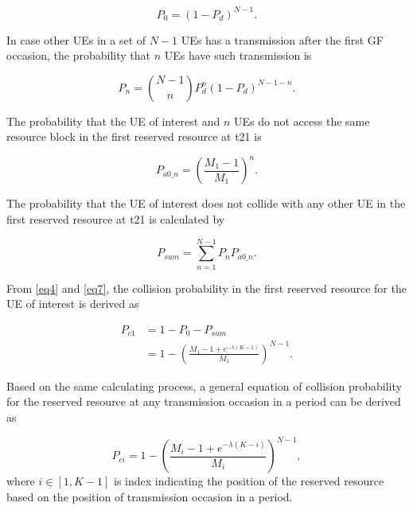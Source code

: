 \documentclass{ieeeaccess}
\begin{document}
\begin{equation}
P_{0} = (1-P_{d})^{N-1}.\label{eq4}
\end{equation}

In case other UEs in a set of $N-1$ UEs has a transmission after the first GF occasion, the probability that $n$  UEs have such transmission is 

\begin{equation}
P_{n} = \binom {N-1}{n}P_{d}^{n}(1-P_{d})^{N-1-n}.\label{eq5}
\end{equation}

The probability that the UE of interest and $n$ UEs do not access the same resource block in the first reserved resource at t21 is 

\begin{equation}
P_{a0\_n} = (\frac {M_{1}-1}{M_{1}})^{n}.\label{eq6}
\end{equation}

The probability that the UE of interest does not collide with any other UE in the first reserved resource at t21 is calculated by 

\begin{equation}
P_{sum} = \sum_{n=1}^{N-1} P_{n}P_{a0\_n}.\label{eq7}
\end{equation}

From \eqref{eq4} and \eqref{eq7}, the collision probability in the first reserved resource for the UE of interest is derived as 

\begin{align}
P_{c1} &= 1 - P_{0} - P_{sum} \nonumber\\
 &= 1 - (\frac{M_{1}-1+e^{-\lambda(K-1)}}{M_{1}})^{N-1}.\label{eq8}
\end{align}

Based on the same calculating process, a general equation of collision probability for the reserved resource at any transmission occasion in a period can be derived as 

\begin{equation}
P_{ci} = 1 - (\frac{M_{i}-1+e^{-\lambda(K-i)}}{M_{i}})^{N-1},\label{eq9}
\end{equation}
where
$i \in [1, K-1]$ is index indicating the position of the reserved resource based on the position of transmission occasion in a period.
\end{document}
